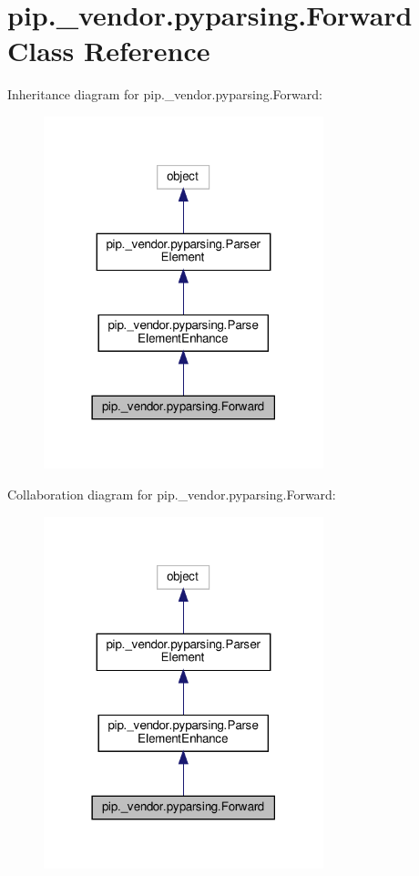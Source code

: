 \hypertarget{classpip_1_1__vendor_1_1pyparsing_1_1Forward}{}\section{pip.\+\_\+vendor.\+pyparsing.\+Forward Class Reference}
\label{classpip_1_1__vendor_1_1pyparsing_1_1Forward}


Inheritance diagram for pip.\+\_\+vendor.\+pyparsing.\+Forward\+:
\nopagebreak
\begin{figure}[H]
\begin{center}
\leavevmode
\includegraphics[width=230pt]{classpip_1_1__vendor_1_1pyparsing_1_1Forward__inherit__graph}
\end{center}
\end{figure}


Collaboration diagram for pip.\+\_\+vendor.\+pyparsing.\+Forward\+:
\nopagebreak
\begin{figure}[H]
\begin{center}
\leavevmode
\includegraphics[width=230pt]{classpip_1_1__vendor_1_1pyparsing_1_1Forward__coll__graph}
\end{center}
\end{figure}
